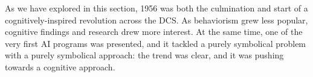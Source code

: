 \documentclass[../main.tex]{subfiles}
\begin{document}
\vspace{4pt}
As we have explored in this section, 1956 was both the culmination and start of a cognitively-inspired revolution across the DCS. As behaviorism grew less popular, cognitive findings and research drew more interest. At the same time, one of the very first AI programs was presented, and it tackled a purely symbolical problem with a purely symbolical approach: the trend was clear, and it was pushing towards a cognitive approach.
\end{document}
